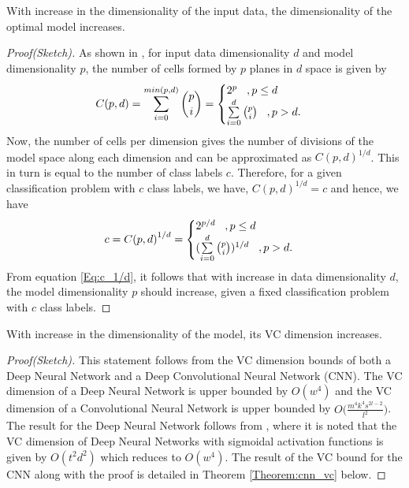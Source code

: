 \documentclass[11pt,a4paper]{article}
\begin{document}
\begin{lemma}\label{Lemma:data_model}
With increase in the dimensionality of the input data, the dimensionality of the optimal model increases.
\end{lemma}
\begin{proof}[Proof(Sketch)] As shown in \cite{Makhoul1989}, for input data dimensionality $d$ and model dimensionality $p$, the number of cells formed by $p$ planes in $d$ space is given by
\begin{equation}\label{Eq:C(p,d)}
C(p,d) = \sum\limits_{i=0}^{min(p,d)} {{p}\choose{i}} =
\begin{cases}
%
2^p
\hspace{3mm}   ,p \leq d  \\
\sum\limits_{i=0}^d {{p}\choose{i}}
\hspace{3mm} ,p>d.
%
\end{cases}
\end{equation}
Now, the number of cells per dimension gives the number of divisions of the model space along each dimension and can be approximated as $C(p,d)^{1/d}$. This in turn is equal to the number of class labels $c$. Therefore, for a given classification problem with $c$ class labels, we have, ${C(p,d)}^{1/d} = c$ and hence, we have
\begin{equation}\label{Eq:c_1/d}
c = {C(p,d)}^{1/d} =
\begin{cases}
%
2^{p/d}
\hspace{3mm}   ,p \leq d  \\
(\sum\limits_{i=0}^d {{p}\choose{i}})^{1/d}
\hspace{3mm} ,p>d.
%
\end{cases}
\end{equation}
From equation \ref{Eq:c_1/d}, it follows that with increase in data dimensionality $d$, the model dimensionality $p$ should increase, given a fixed classification problem with $c$ class labels. 
\end{proof}
\begin{lemma}\label{Lemma:data_vc}
With increase in the dimensionality of the model, its VC dimension increases.
\end{lemma}
\begin{proof}[Proof(Sketch)] This statement follows from the VC dimension bounds of both a Deep Neural Network and a Deep Convolutional Neural Network (CNN). The VC dimension of a Deep Neural Network is upper bounded by $O(w^4)$ and the VC dimension of a Convolutional Neural Network is upper bounded by $O\Big(\frac{m^4k^4s^{2l-2}}{l^2}\Big)$. The result for the Deep Neural Network follows from \cite{Bartlett_vapnik-chervonenkisdimension}, where it is noted that the VC dimension of Deep Neural Networks with sigmoidal activation functions is given by $O(t^2d^2)$ which reduces to $O(w^4)$. The result of the VC bound for the CNN along with the proof is detailed in Theorem \ref{Theorem:cnn_vc} below.  
\end{proof}
\end{document}

